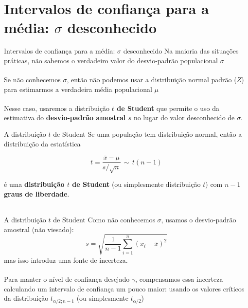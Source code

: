 \documentclass[10pt]{beamer}\usepackage[]{graphicx}\usepackage[]{color}
\theoremstyle{definition}
\begin{document}
\section{Intervalos de confiança para a média: $\sigma$ desconhecido}

\begin{frame}{Intervalos de confiança para a média: $\sigma$ desconhecido}
  Na maioria das situações práticas, não sabemos o verdadeiro valor do
  desvio-padrão populacional $\sigma$\\~\\
  Se não conhecemos $\sigma$, então não podemos usar a distribuição
  normal padrão ($Z$) para estimarmos a verdadeira média populacional
  $\mu$ \\~\\
  Nesse caso, usaremos a distribuição \textbf{$t$ de Student} que
  permite o uso da estimativa do \textbf{desvio-padrão amostral $s$} no
  lugar do valor desconhecido de $\sigma$.
\end{frame}

\begin{frame}{A distribuição $t$ de Student}
  Se uma população tem distribuição normal, então a distribuição da
  estatística

  \begin{equation*}
    t = \frac{\bar{x} - \mu}{s/\sqrt{n}} \, \sim \, t(n-1)
  \end{equation*}

  é uma \textbf{distribuição $t$ de Student} (ou simplesmente
  distribuição $t$) com $n-1$ \textbf{graus de liberdade}.\\~\\
\end{frame}

\begin{frame}{A distribuição $t$ de Student}
  Como não conhecemos $\sigma$, usamos o desvio-padrão amostral (não
  viesado):
  \begin{equation*}
    s = \sqrt{\frac{1}{n-1} \sum_{i=1}^{n} (x_i - \bar{x})^2}
  \end{equation*}
  mas isso introduz uma fonte de incerteza. \\~\\
  Para manter o nível de confiança desejado $\gamma$, compensamos essa
  incerteza calculando um intervalo de confiança um pouco maior: usando
  os valores críticos da distribuição $t_{\alpha/2;n-1}$ (ou
  simplesmente $t_{\alpha/2}$)
\end{frame}
\end{document}
